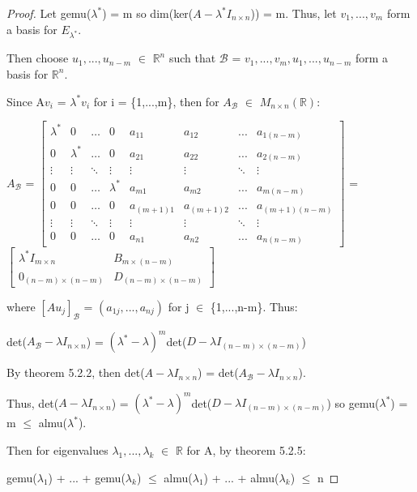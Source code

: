     \begin{proof}
        Let gemu($\lambda^*$) = m so dim(ker($A - \lambda^* I_{n \times n}$)) = m.
        Thus, let $v_1,...,v_m$ form a basis for $E_{\lambda^*}$.

        Then choose $u_1,...,u_{n-m}$ $\in$ $\mathbb{R}^n$ such that
        $\mathcal{B}$ = $v_1,...,v_m,u_1,...,u_{n-m}$
        form a basis for $\mathbb{R}^n$.

        Since A$v_i$ = $\lambda^*v_i$ for i = \{1,...,m\}, then
        for $A_{\mathcal{B}}$ $\in$ $M_{n \times n}(\mathbb{R})$:

        \hspace{0.5cm}
        $A_{\mathcal{B}}$ =
        \footnotesize
        $\begin{bmatrix}
            \lambda^* & 0 & \hdots & 0 & a_{11} & a_{12} & ... & a_{1(n-m)} \\
            0 & \lambda^* & \hdots & 0 & a_{21} & a_{22} & ... & a_{2(n-m)} \\
            \vdots & \vdots & \ddots & \vdots & \vdots & \vdots & \ddots & \vdots \\
            0 & 0 & \hdots & \lambda^* & a_{m1} & a_{m2} & ... & a_{m(n-m)} \\
            0 & 0 & \hdots & 0 & a_{(m+1)1} & a_{(m+1)2} & ... & a_{(m+1)(n-m)} \\
            \vdots & \vdots & \ddots & \vdots & \vdots & \vdots & \ddots & \vdots \\
            0 & 0 & \hdots & 0 & a_{n1} & a_{n2} & ... & a_{n(n-m)} 
        \end{bmatrix}$
        \normalsize
        =
        \footnotesize
        $\begin{bmatrix}
            \lambda^* I_{m \times n} & B_{m \times (n-m)} \\
            0_{(n-m) \times (n-m)} & D_{(n-m) \times (n-m)}
        \end{bmatrix}$
        \normalsize

        where $[Au_j]_{\mathcal{B}}$ = $(a_{1j},...,a_{nj})$
        for j $\in$ \{1,...,n-m\}. Thus:

        \hspace{0.5cm}
        det($A_{\mathcal{B}} - \lambda I_{n \times n}$)
        = $(\lambda^* - \lambda)^m$det($D - \lambda I_{(n-m) \times (n-m)}$)
        
        By {\color{red} theorem 5.2.2}, then det($A - \lambda I_{n \times n}$)
        = det($A_{\mathcal{B}} - \lambda I_{n \times n}$).

        Thus, det($A - \lambda I_{n \times n}$)
        = $(\lambda^* - \lambda)^m$det($D - \lambda I_{(n-m) \times (n-m)}$)
        so gemu($\lambda^*$) = m $\leq$ almu($\lambda^*$).

        Then for eigenvalues $\lambda_1,...,\lambda_k$ $\in$ $\mathbb{R}$
        for A, by {\color{red} theorem 5.2.5}:

        \hspace{0.5cm}
        gemu($\lambda_1$) + ... + gemu($\lambda_k$)
        $\leq$ almu($\lambda_1$) + ... + almu($\lambda_k$)
        $\leq$ n
    \end{proof}
    
